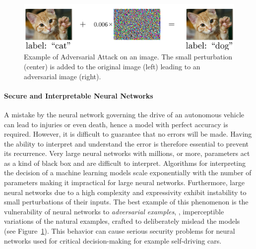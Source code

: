 \begin{figure}[htb]
  \centering
  \includegraphics[width=\textwidth]{figures/chapter1/ExampleAdversarialCatDog.pdf}
  \caption{Example of Adversarial Attack on an image. The small perturbation (center) is added to the original image (left) leading to an adversarial image (right).}
  \label{figure:adversarial_image_example}
\end{figure}

\paragraph{Secure and Interpretable Neural Networks}
A mistake by the neural network governing the drive of an autonomous vehicle can lead to injuries or even death, hence a model with perfect accuracy is required.
However, it is difficult to guarantee that no errors will be made.
Having the ability to interpret and understand the error is therefore essential to prevent its recurrence.
Very large neural networks with millions, or more, parameters act as a kind of black box and are difficult to interpret.
Algorithms \cite{lundberg2017unified} for interpreting the decision of a machine learning models scale exponentially with the number of parameters making it impractical for large neural networks. 
Furthermore, large neural networks due to a high complexity and expressivity exhibit instability to small perturbations of their inputs.
The best example of this phenomenon is the vulnerability of neural networks to \emph{adversarial examples}, \ie, imperceptible variations of the natural examples, crafted to deliberately mislead the models~\cite{globerson2006nightmare,biggio2013evasion,szegedy2013intriguing} (see Figure~\ref{figure:adversarial_image_example}). 
This behavior can cause serious security problems for neural networks used for critical decision-making for example self-driving cars.



